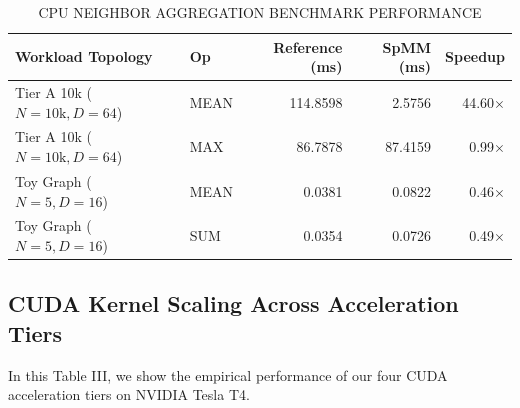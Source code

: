 \documentclass[journal]{IEEEtran}
\begin{document}
\begin{table}[!t]
\centering
\caption{CPU NEIGHBOR AGGREGATION BENCHMARK PERFORMANCE}
\label{tab:cpu_bench}
\begin{tabular}{llrrr}
\toprule
\textbf{Workload Topology} & \textbf{Op} & \textbf{Reference (ms)} & \textbf{SpMM (ms)} & \textbf{Speedup} \\
\midrule
Tier A 10k ($N=10\text{k}, D=64$) & MEAN & 114.8598 & 2.5756 & 44.60$\times$ \\
Tier A 10k ($N=10\text{k}, D=64$) & MAX  & 86.7878 & 87.4159 & 0.99$\times$ \\
Toy Graph ($N=5, D=16$) & MEAN & 0.0381 & 0.0822 & 0.46$\times$ \\
Toy Graph ($N=5, D=16$) & SUM  & 0.0354 & 0.0726 & 0.49$\times$ \\
\bottomrule
\end{tabular}
\end{table}

\subsection{CUDA Kernel Scaling Across Acceleration Tiers}
In this Table III, we show the empirical performance of our four CUDA acceleration tiers on NVIDIA Tesla T4.
\end{document}
